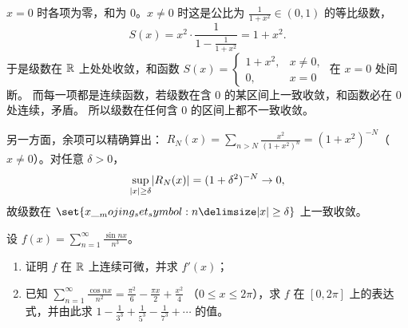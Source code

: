 \documentclass{mojing-exercise}
\begin{document}
\begin{solution}
$x=0$ 时各项为零，和为 $0$。$x\ne0$ 时这是公比为 $\frac{1}{1+x^2}\in(0,1)$ 的等比级数，
\[
  S(x)=x^2\cdot\frac{1}{1-\frac{1}{1+x^2}}=1+x^2 .
\]
于是级数在 $\mathbb{R}$ 上处处收敛，和函数
$S(x)=\begin{cases}1+x^2,&x\ne0,\\0,&x=0\end{cases}$ 在 $x=0$ 处间断。
而每一项都是连续函数，若级数在含 $0$ 的某区间上一致收敛，和函数必在 $0$ 处连续，矛盾。
所以级数在任何含 $0$ 的区间上都不一致收敛。

另一方面，余项可以精确算出：
$R_N(x)=\sum_{n>N}\frac{x^2}{(1+x^2)^n}=(1+x^2)^{-N}$（$x\ne0$）。对任意 $\delta>0$，
\[
  \sup_{\lvert x\rvert\ge\delta}\lvert R_N(x)\rvert=(1+\delta^2)^{-N}\to0,
\]
故级数在 $\set{x\given\abs{x}\ge\delta}$ 上一致收敛。

\begin{center}
\end{center}
\end{solution}

\begin{problem}[difficulty=2, space=5cm]
设 $\displaystyle f(x)=\sum_{n=1}^{\infty}\frac{\sin nx}{n^3}$。
\begin{enumerate}
  \item 证明 $f$ 在 $\mathbb{R}$ 上连续可微，并求 $f'(x)$；
  \item 已知 $\displaystyle\sum_{n=1}^{\infty}\frac{\cos nx}{n^2}=\frac{\pi^2}{6}-\frac{\pi x}{2}+\frac{x^2}{4}$
        （$0\le x\le2\pi$），求 $f$ 在 $[0,2\pi]$ 上的表达式，并由此求
        $\displaystyle1-\frac{1}{3^3}+\frac{1}{5^3}-\frac{1}{7^3}+\dotsb$ 的值。
\end{enumerate}
\end{problem}
\end{document}
